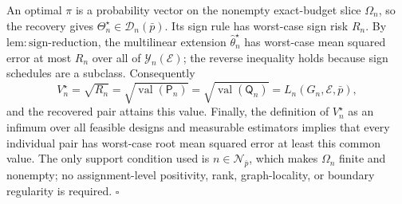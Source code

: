 An optimal \(\pi\) is a probability vector on the nonempty exact-budget slice \(\Omega_n\), so the recovery gives \(\Theta_n^\star\in\mathcal D_n(\bar p)\).  Its sign rule has worst-case sign risk \(R_n\).  By \(\mathrm{lem{:}sign\text{-}reduction}\), the multilinear extension \(\widehat\theta_n^\star\) has worst-case mean squared error at most \(R_n\) over all of \(\mathcal Y_n(\mathcal E)\); the reverse inequality holds because sign schedules are a subclass.  Consequently
\[
 V_n^\star=\sqrt{R_n}
 =\sqrt{\operatorname{val}(\mathsf P_n)}
 =\sqrt{\operatorname{val}(\mathsf Q_n)}
 =L_n(G_n,\mathcal E,\bar p),
\]
and the recovered pair attains this value.  Finally, the definition of \(V_n^\star\) as an infimum over all feasible designs and measurable estimators implies that every individual pair has worst-case root mean squared error at least this common value.  The only support condition used is \(n\in\mathcal N_{\bar p}\), which makes \(\Omega_n\) finite and nonempty; no assignment-level positivity, rank, graph-locality, or boundary regularity is required. \(\square\)